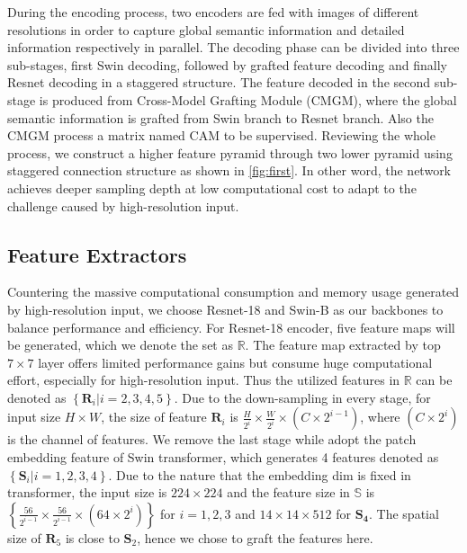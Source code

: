 \documentclass[10pt,twocolumn,letterpaper]{article}
\begin{document}
During the encoding process, two encoders are fed with images of different resolutions in order to capture global semantic information and detailed information respectively in parallel. The decoding phase can be divided into three sub-stages, first Swin decoding, followed by grafted feature decoding and finally Resnet decoding in a staggered structure. The feature decoded in the second sub-stage is produced from Cross-Model Grafting Module (CMGM), where the global semantic information is grafted from Swin branch to Resnet branch. Also the CMGM process a matrix named $\mathrm{CAM}$ to be supervised. Reviewing the whole process, we construct a higher feature pyramid through two lower pyramid using  staggered connection structure as shown in \cref{fig:first}. In other word, the network achieves deeper sampling depth at low computational cost to adapt to the challenge caused by high-resolution input.

\subsection{Feature Extractors}
Countering the massive computational consumption and memory usage generated by high-resolution input, we choose Resnet-18 \cite{he2016deep} and Swin-B \cite{liu2021swin} as our backbones to balance performance and efficiency. For Resnet-18 encoder, five feature maps will be generated, which we denote the set as $\mathbb{R}$. The feature map extracted by top $7 \times 7 $ layer offers limited performance gains but consume huge computational effort, especially for high-resolution input. Thus the utilized features in $\mathbb{R}$ can be denoted as $\left\{ \bm{R}_i|i=2,3,4,5 \right\}$. Due to the down-sampling in every stage,  for input size $ H \times W$, the size of feature $\bm{R}_i$ is $ \frac{H}{2^i} \times \frac{W}{2^i} \times ({C}\times{2^{i-1}})$, where $({C}\times{2^i})$ is the channel of features. We remove the last stage while adopt the patch embedding feature of Swin transformer, which generates 4 features denoted as $\left\{ \bm{S}_i|i=1,2,3,4 \right\}$. Due to the nature that the embedding dim is fixed in transformer, the input size is $224 \times 224$ and the feature size in $\mathbb{S}$ is$\left\{ \frac{56}{2^{i-1}} \times \frac{56}{2^{i-1}} \times ({64}\times{2^i}) \right\}$ for $i=1,2,3$ and $14 \times 14 \times 512$ for $\bm{S_4}$.  The spatial size of $\bm{R}_5$ is close to $\bm{S}_2$, hence we chose to graft the features here.
\label{subsec:feature extracter}
\end{document}
